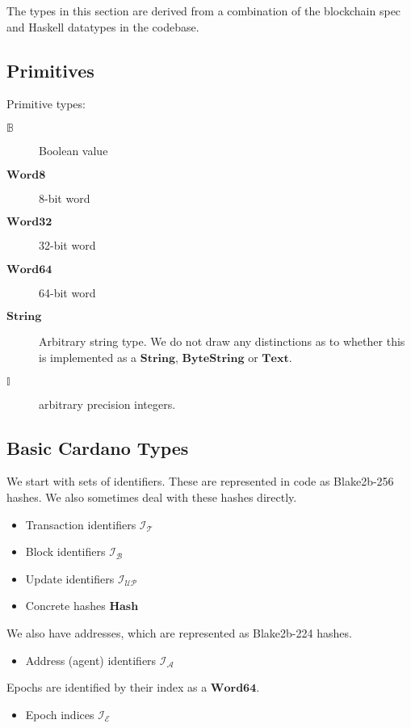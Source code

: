 \documentclass{article}
\newcommand{\idsof}[1]{\mathcal{I}\!_#1}
\newcommand{\txids}{\idsof{\txs}}
\newcommand{\blockids}{\idsof{\blocks}}
\newcommand{\agentids}{\idsof{\agents}}
\newcommand{\epochids}{\idsof{\mathcal{E}}}
\newcommand{\updids}{\idsof{\mathcal{UP}}}
\newcommand{\agents}{\mathcal{A}}
\newcommand{\txs}{\mathcal{T}}
\newcommand{\blocks}{\mathcal{B}}
\newcommand{\hstype}[1]{\textbf{#1}}
\newcommand{\String}{\hstype{String}}
\newcommand{\Word}[1]{\hstype{Word#1}}
\newcommand{\hash}{\hstype{Hash}}
\newcommand{\Integer}{\mathbb{I}}
\newcommand{\Bool}{\mathbb{B}}
\begin{document}
The types in this section are derived from a combination of the blockchain spec
and Haskell datatypes in the codebase.

\subsection{Primitives}

Primitive types:

\begin{description}
\item [$\Bool$] Boolean value
\item [$\Word{8}$] 8-bit word
\item [$\Word{32}$] 32-bit word
\item [$\Word{64}$] 64-bit word
\item [$\String$] Arbitrary string type. We do not draw any distinctions as to
  whether this is implemented as a $\hstype{String}$, $\hstype{ByteString}$ or
  $\hstype{Text}$.
\item [$\Integer$] arbitrary precision integers.
\end{description}

\subsection{Basic Cardano Types}

We start with sets of identifiers. These are represented in code as Blake2b-256
hashes. We also sometimes deal with these hashes directly.

\begin{itemize}
\item{Transaction identifiers $\txids$}
\item{Block identifiers $\blockids$}
\item Update identifiers $\updids$
\item Concrete hashes $\hash$
\end{itemize}

We also have addresses, which are represented as Blake2b-224 hashes.

\begin{itemize}
\item{Address (agent) identifiers $\agentids$}
\end{itemize}

Epochs are identified by their index as a $\Word{64}$.

\begin{itemize}
\item Epoch indices $\epochids$
\end{itemize}
\end{document}
